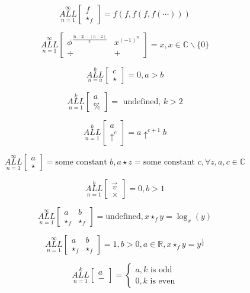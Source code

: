 \documentclass{article}
\begin{document}
$$\underset{n=1}{\overset{\infty}{ALL}} \begin{bmatrix}
f \\
\star_f
\end{bmatrix}=f(f,f(f,f(\cdots)))$$

$$\underset{n=1}{\overset{\infty}{ALL}} \begin{bmatrix}
\phi^{\frac{|n-2|-(n-2)}{2}} & x^{(-1)^n} \\
\div & +
\end{bmatrix}=x, x \in \mathbb{C} \backslash \{ 0 \}$$

$$\underset{n=a}{\overset{b}{ALL}} \begin{bmatrix}
c \\
\star
\end{bmatrix} = 0, a>b$$

$$\underset{n=1}{\overset{k}{ALL}} \begin{bmatrix}
a \\
\%
\end{bmatrix}=\text{ undefined, } k>2$$

$$\underset{n=1}{\overset{b}{ALL}} \begin{bmatrix}
a \\
\uparrow^c
\end{bmatrix}=a \uparrow^{c+1} b$$

$$\underset{n=1}{\overset{\infty}{ALL}} \begin{bmatrix}
a \\
\star
\end{bmatrix} = \text{some constant } b, a \star z = \text{some constant } c, \forall z, a, c \in \mathbb{C}$$

$$\underset{n=1}{\overset{b}{ALL}} \begin{bmatrix}
\vec{v} \\
\times
\end{bmatrix}=0,b>1$$

$$\underset{n=1}{\overset{\infty}{ALL}} \begin{bmatrix}
a & b \\
\star_f & \star_f
\end{bmatrix} = \text{undefined}, x \star_f y = \log_x (y)$$

$$\underset{n=1}{\overset{\infty}{ALL}} \begin{bmatrix}
a & b \\
\star_f & \star_f
\end{bmatrix} = 1, b>0, a \in \mathbb{R}, x \star_f y = y^\frac{1}{x}$$

$$\underset{n=1}{\overset{k}{ALL}} \begin{bmatrix}
a \\
-
\end{bmatrix} = \left\{ \begin{array}{rcl}
a, k \text{ is odd} \\ 0, k \text{ is even} \end{array}\right.
$$
\end{document}
